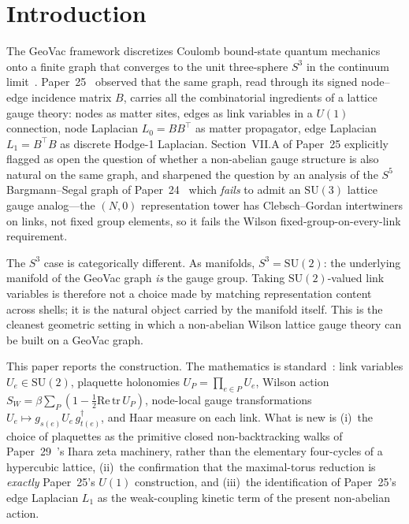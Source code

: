 \documentclass[11pt]{article}
\begin{document}
\section{Introduction}
\label{sec:intro}

The GeoVac framework discretizes Coulomb bound-state quantum mechanics
onto a finite graph that converges to the unit three-sphere $S^3$ in
the continuum limit~\cite{paper7}.  Paper~25~\cite{paper25} observed
that the same graph, read through its signed node--edge incidence
matrix $B$, carries all the combinatorial ingredients of a lattice
gauge theory: nodes as matter sites, edges as link variables in a
$U(1)$ connection, node Laplacian $L_0 = B B^{\top}$ as matter
propagator, edge Laplacian $L_1 = B^{\top} B$ as discrete Hodge-1
Laplacian.  Section~VII.A of Paper~25 explicitly flagged as open the
question of whether a non-abelian gauge structure is also natural on
the same graph, and sharpened the question by an analysis of the
$S^5$ Bargmann--Segal graph of Paper~24~\cite{paper24} which
\emph{fails} to admit an $\mathrm{SU}(3)$ lattice gauge analog---the
$(N, 0)$ representation tower has Clebsch--Gordan intertwiners on
links, not fixed group elements, so it fails the Wilson
fixed-group-on-every-link requirement.

The $S^3$ case is categorically different.  As manifolds,
$S^3 = \mathrm{SU}(2)$: the underlying manifold of the GeoVac graph
\emph{is} the gauge group.  Taking $\mathrm{SU}(2)$-valued link
variables is therefore not a choice made by matching representation
content across shells; it is the natural object carried by the
manifold itself.  This is the cleanest geometric setting in which a
non-abelian Wilson lattice gauge theory can be built on a GeoVac graph.

This paper reports the construction.  The mathematics is
standard~\cite{wilson1974,creutz1983}: link variables
$U_e \in \mathrm{SU}(2)$, plaquette holonomies $U_P = \prod_{e \in P}
U_e$, Wilson action
$S_W = \beta \sum_P (1 - \tfrac{1}{2} \mathrm{Re}\,\mathrm{tr}\,U_P)$,
node-local gauge transformations $U_e \mapsto g_{s(e)}^{\phantom{\dagger}}
U_e\, g_{t(e)}^{\dagger}$, and Haar measure on each link.  What is new
is (i)~the choice of plaquettes as the primitive closed non-backtracking
walks of Paper~29~\cite{paper29}'s Ihara zeta machinery, rather than the
elementary four-cycles of a hypercubic lattice, (ii)~the confirmation
that the maximal-torus reduction is \emph{exactly} Paper~25's $U(1)$
construction, and (iii)~the identification of Paper~25's edge Laplacian
$L_1$ as the weak-coupling kinetic term of the present non-abelian
action.
\end{document}
